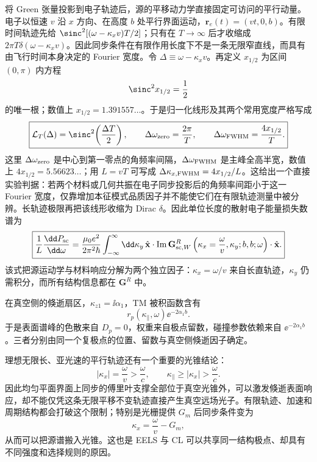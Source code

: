 将 Green 张量投影到电子轨迹后，源的平移动力学直接固定可访问的平行动量。电子以恒速 $v$ 沿 $x$ 方向、在高度 $b$ 处平行界面运动，$\mathbf r_e(t)=(vt,0,b)$。有限时间轨迹先给 $\sinc^2[(\omega-\kappa_xv)T/2]$；只有在 $T\to\infty$ 后才收缩成 $2\pi T\delta(\omega-\kappa_xv)$。因此同步条件在有限作用长度下不是一条无限窄直线，而具有由飞行时间本身决定的 Fourier 宽度。令 $\Delta\equiv\omega-\kappa_xv$。再定义 $x_{1/2}$ 为区间 $(0,\pi)$ 内方程
\begin{equation*}
 \sinc^2x_{1/2}=\frac12
\end{equation*}
的唯一根；数值上 $x_{1/2}=1.391557\ldots$。于是归一化线形及其两个常用宽度严格写成
\begin{equation}
\boxed{
\mathcal L_T(\Delta)=\sinc^2\!\left(\frac{\Delta T}{2}\right),
\qquad
\Delta\omega_{\rm zero}=\frac{2\pi}{T},
\qquad
\Delta\omega_{\rm FWHM}=\frac{4x_{1/2}}{T}.}
\label{eq:finite-trajectory-sync-linewidth-dp83}
\end{equation}
这里 $\Delta\omega_{\rm zero}$ 是中心到第一零点的角频率间隔，$\Delta\omega_{\rm FWHM}$ 是主峰全高半宽，数值上 $4x_{1/2}=5.56623\ldots$；用 $L=vT$ 可写成 $\Delta\kappa_{x,{\rm FWHM}}=4x_{1/2}/L$。这给出一个直接实验判据：若两个材料或几何共振在电子同步投影后的角频率间距小于这一 Fourier 宽度，仅靠增加本征模式品质因子并不能使它们在有限轨迹测量中被分辨。长轨迹极限再把该线形收缩为 Dirac $\delta$。因此单位长度的散射电子能量损失数谱为
\begin{equation}
\boxed{
\frac1L\frac{\dd P_{\rm sc}}{\dd\omega}
=\frac{\mu_0e^2}{2\pi^2\hbar}
\int_{-\infty}^{\infty}\dd\kappa_y\,
\hat{\mathbf x}\cdot\operatorname{Im}\mathbf G_{{\rm sc},W}^R
\left(\kappa_x=\frac{\omega}{v},\kappa_y;b,b;\omega\right)
\cdot\hat{\mathbf x}.}
\label{eq:planar_eels_mixed_green_per_length}
\end{equation}
该式把源运动学与材料响应分解为两个独立因子：$\kappa_x=\omega/v$ 来自长直轨迹，$\kappa_y$ 仍需积分，而所有结构信息都在 $\mathbf G^R$ 中。

在真空侧的倏逝扇区，$\kappa_{z1}=\ii\alpha_1$，TM 被积函数含有
\begin{equation}
\boxed{r_p(\kappa_\parallel,\omega)\ee^{-2\alpha_1b}.}
\label{eq:surface_pole_distance_kernel}
\end{equation}
于是表面谱峰的色散来自 $D_p=0$，权重来自极点留数，碰撞参数依赖来自 $\ee^{-2\alpha_1b}$。三者分别由同一个复极点的位置、留数与真空侧倏逝因子确定。

理想无限长、亚光速的平行轨迹还有一个重要的光锥结论：
\begin{equation}
|\kappa_x|=\frac{\omega}{v}>\frac{\omega}{c},
\qquad \kappa_\parallel\ge |\kappa_x|>\frac{\omega}{c}.
\label{eq:parallel_electron_outside_light_cone}
\end{equation}
因此均匀平面界面上同步的傅里叶支撑全部位于真空光锥外，可以激发倏逝表面响应，却不能仅凭这条无限平移不变轨迹直接产生真空远场光子。有限轨迹、加速和周期结构都会打破这个限制；特别是光栅提供 $G_m$ 后同步条件变为
\begin{equation}
\kappa_x=\frac{\omega}{v}-G_m,
\label{eq:grating_light_cone_momentum_shift}
\end{equation}
从而可以把源谱搬入光锥。这也是 EELS 与 CL 可以共享同一结构极点、却具有不同强度和选择规则的原因。

